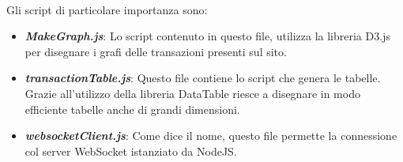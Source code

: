 \begin{itemize}
\\Gli script di particolare importanza sono:
\begin{itemize}
\item  \textbf{\textit{MakeGraph.js}}: Lo script contenuto in questo file, utilizza la libreria D3.js per disegnare i grafi delle transazioni presenti sul sito.
\item  \textbf{\textit{transactionTable.js}}: Questo file contiene lo script che genera le tabelle. Grazie all'utilizzo della libreria DataTable riesce a disegnare in modo efficiente tabelle anche di grandi dimensioni.
\item  \textbf{\textit{websocketClient.js}}: Come dice il nome, questo file permette la connessione col server WebSocket istanziato da NodeJS.
\end{itemize}
\end{itemize}